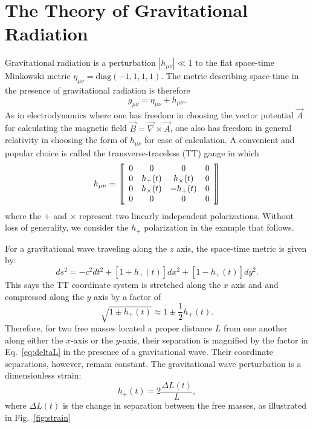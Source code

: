 \section{The Theory of Gravitational Radiation}
Gravitational radiation is a perturbation $|h_{\mu \nu}|
\ll 1$ to the flat space-time Minkowski metric $\eta_{\mu \nu} =
\mbox{diag}(-1, 1, 1, 1)$. The metric describing space-time in the
presence of gravitational radiation is therefore
\begin{equation}
g_{\mu\nu} = \eta_{\mu\nu} + h_{\mu\nu}.
\end{equation}
As in electrodynamics where one has freedom in choosing the
vector potential $\vec{A}$ for calculating the magnetic field $\vec{B}
= \vec{\nabla} \times \vec{A}$, one also has freedom in general
relativity in choosing the form of $h_{\mu \nu}$ for ease of calculation. A
convenient and popular choice is called the transverse-traceless (TT)
gauge in which
\begin{equation}
h_{\mu \nu} = 
\left\llbracket \begin{array}{c c c c} 
0 & 0 & 0 & 0\\ 
0 & h_+(t) & h_\times(t) & 0 \\
0 & h_\times(t) & -h_+(t) & 0 \\
0 & 0 & 0 & 0
\end{array} \right\rrbracket
\end{equation}
where the $+$ and $\times$ represent two linearly independent
polarizations. Without loss of generality, we consider the $h_+$
polarization in the example that follows.

For a gravitational wave traveling along the $z$ axis, the space-time
metric is given by:
\begin{equation}
ds^2 = -c^2dt^2 + [1+h_+(t)] dx^2 + [1-h_+(t)] dy^2.
\end{equation}
This says the TT coordinate system is stretched along the $x$ axis and
and compressed along the $y$ axis by a factor of 
\begin{equation}
\sqrt{1 \pm h_+(t)} \approx 1 \pm \frac{1}{2} h_+(t).
\label{eq:deltaL}
\end{equation}
Therefore, for two free masses located a proper distance $L$ from one
another along either the $x$-axis or the $y$-axis, their separation is
magnified by the factor in Eq.~\ref{eq:deltaL} in the presence of a
gravitational wave. Their coordinate separations, however, remain
constant. The gravitational wave perturbation is a dimensionless
strain:
\begin{equation}
h_+(t) = 2 \frac{\Delta L(t)}{L},
\end{equation}
where $\Delta L(t)$ is the change in separation between the free
masses, as illustrated in Fig.~\ref{fig:strain}

